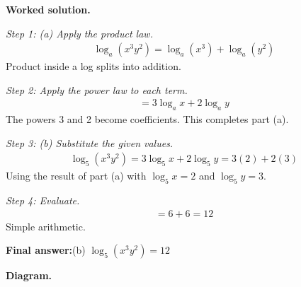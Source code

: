 \documentclass[11pt]{article}
\begin{document}
\textbf{Worked solution.}

\textit{Step 1: (a) Apply the product law.}
\[\begin{gathered}
\log_a(x^3 y^2) = \log_a(x^3) + \log_a(y^2)
\end{gathered}\]
Product inside a log splits into addition.

\textit{Step 2: Apply the power law to each term.}
\[\begin{gathered}
= 3\log_a x + 2\log_a y
\end{gathered}\]
The powers 3 and 2 become coefficients. This completes part (a).

\textit{Step 3: (b) Substitute the given values.}
\[\begin{gathered}
\log_5(x^3 y^2) = 3\log_5 x + 2\log_5 y = 3(2) + 2(3)
\end{gathered}\]
Using the result of part (a) with \( \log_5 x = 2 \) and \( \log_5 y = 3 \).

\textit{Step 4: Evaluate.}
\[\begin{gathered}
= 6 + 6 = 12
\end{gathered}\]
Simple arithmetic.

\begin{answerbox}
\textbf{Final answer:}\quad (b) \(\displaystyle  \log_5(x^3 y^2) = 12 \)
\end{answerbox}
\textbf{Diagram.}
\end{document}
